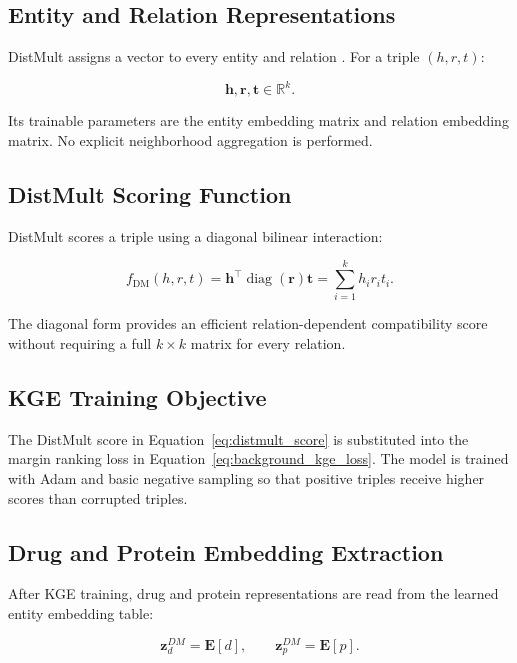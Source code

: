 \subsection{Entity and Relation Representations}

DistMult assigns a vector to every entity and relation
\cite{YangYHGD14a}. For a triple $(h,r,t)$:

\begin{equation}
    \mathbf{h},\mathbf{r},\mathbf{t}
    \in
    \mathbb{R}^{k}.
\end{equation}

Its trainable parameters are the entity embedding matrix and relation
embedding matrix. No explicit neighborhood aggregation is performed.

\subsection{DistMult Scoring Function}

DistMult scores a triple using a diagonal bilinear interaction:

\begin{equation}
    f_{\mathrm{DM}}(h,r,t)
    =
    \mathbf{h}^{\top}
    \operatorname{diag}(\mathbf{r})
    \mathbf{t}
    =
    \sum_{i=1}^{k}h_i r_i t_i.
    \label{eq:distmult_score}
\end{equation}

The diagonal form provides an efficient relation-dependent compatibility score
without requiring a full $k\times k$ matrix for every relation.

\subsection{KGE Training Objective}

The DistMult score in Equation~\ref{eq:distmult_score} is substituted into the
margin ranking loss in Equation~\ref{eq:background_kge_loss}. The model is
trained with Adam and basic negative sampling so that positive triples receive
higher scores than corrupted triples.

\subsection{Drug and Protein Embedding Extraction}

After KGE training, drug and protein representations are read from the learned
entity embedding table:

\begin{equation}
    \mathbf{z}_{d}^{DM}=\mathbf{E}[d],
    \qquad
    \mathbf{z}_{p}^{DM}=\mathbf{E}[p].
\end{equation}

